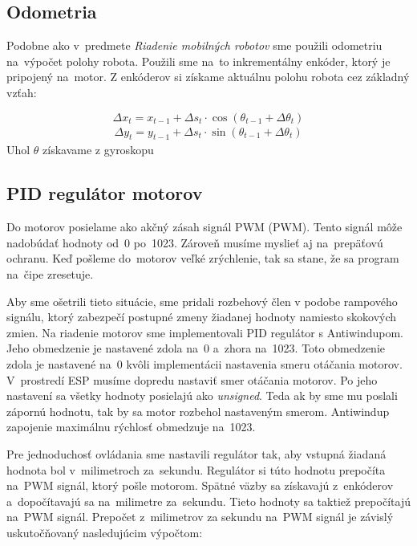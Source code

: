 \newpage
\subsection{Odometria}
\label{subsec:odometria}

Podobne ako v~predmete \textit{Riadenie mobilných robotov} sme použili odometriu na~výpočet polohy robota.
Použili sme na~to inkrementálny enkóder, ktorý je pripojený na~motor. Z enkóderov si získame aktuálnu polohu robota
cez základný vzťah:

\begin{equation}
	\label{eq:odometria}
	 \Delta x_t = x_{t-1} + \Delta s_t \cdot \cos(\theta_{t-1} + \Delta \theta_t)
\end{equation}
\begin{align*}
	\Delta y_t = y_{t-1} + \Delta s_t \cdot \sin(\theta_{t-1} + \Delta \theta_t)
\end{align*}
Uhol $\theta$ získavame z gyroskopu 


\newpage

\subsection{PID regulátor motorov}
\label{subsec:pid}

Do motorov posielame ako akčný zásah signál PWM (\acrlong{PWM}). Tento signál môže nadobúdať hodnoty od~0 po~1023.
Zároveň musíme myslieť aj na~prepäťovú ochranu. Keď pošleme do~motorov veľké zrýchlenie, tak sa stane, že sa program
na~čipe zresetuje.

Aby sme ošetrili tieto situácie, sme pridali rozbehový člen v podobe rampového signálu, ktorý zabezpečí postupné zmeny žiadanej hodnoty namiesto skokových zmien. Na riadenie motorov sme implementovali PID regulátor s Antiwindupom. 
Jeho obmedzenie je nastavené zdola na~0 a~zhora na~1023. Toto obmedzenie zdola je nastavené na~0 kvôli implementácii nastavenia smeru
otáčania motorov. V~prostredí ESP musíme dopredu nastaviť smer otáčania motorov. Po jeho nastavení sa všetky hodnoty
posielajú ako \textit{unsigned}. Teda ak by sme mu poslali zápornú hodnotu, tak by sa motor rozbehol nastaveným smerom.
Antiwindup zapojenie maximálnu rýchlosť obmedzuje na~1023.

Pre jednoduchosť ovládania sme nastavili regulátor tak, aby vstupná žiadaná hodnota bol v~milimetroch za~sekundu.
Regulátor si túto hodnotu prepočíta na~PWM signál, ktorý pošle motorom. Spätné väzby sa získavajú z~enkóderov
a~dopočítavajú sa na~milimetre za~sekundu. Tieto hodnoty sa taktiež prepočítajú na~PWM signál. Prepočet z~milimetrov
za sekundu na~PWM signál je závislý uskutočňovaný nasledujúcim výpočtom:

